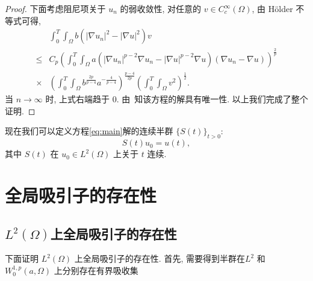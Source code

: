 \documentclass[oneside,longtitle]{LZUthesis}
\numberwithin{equation}{chapter}
\newcommand*\abs[1]{\lvert#1\rvert}
\newcommand*\Brace[1]{\lbrace#1\rbrace}
\begin{document}
\begin{proof}
	下面考虑阻尼项关于 $u_n$ 的弱收敛性,
	对任意的 $v \in C_c^\infty(\Omega)$, 由 H\"older 不等式可得,
	\begin{equation*}
		\begin{split}
			& \int_0^T\int_{\Omega}b\left(\abs{\nabla u_n}^2
			- \abs{\nabla u}^2\right)v\\
			\leq{} & C_p\left(\int_0^T\int_{\Omega}a
			\left(\abs{\nabla u_n}^{p-2}\nabla u_n
			- \abs{\nabla u}^{p-2}\nabla u\right)
			\left(\nabla u_n - \nabla u\right)\right)^{\frac{2}{p}}\\
			\times{} & \left(\int_0^T\int_{\Omega}b^{\frac{2p}{p-4}}a^{-\frac{4}{p-4}}\right)^{\frac{p-4}{2p}}
			\left(\int_0^T\int_{\Omega}v^2\right)^{\frac{1}{2}}.
		\end{split}
	\end{equation*}
	当 $n \to \infty$ 时, 上式右端趋于 $0$.
	由~\cite{Zhan2019Uniquenessa}知该方程的解具有唯一性.
	以上我们完成了整个证明.
\end{proof}

现在我们可以定义方程\eqref{eq:main}解的连续半群 $\Brace{S(t)}_{t>0}$:
\begin{equation*}
	S(t)u_0 = u(t),
\end{equation*}
其中 $S(t)$ 在 $u_{0} \in L^2(\Omega)$ 上关于 $t$ 连续.
\chapter{全局吸引子的存在性}\label{ch:existence_of_the_global_attractors}
\section{$L^2(\Omega)$上全局吸引子的存在性}
下面证明 $L^2(\Omega)$ 上全局吸引子的存在性.
首先, 需要得到半群在$L^2$ 和 $W_0^{1,p}(a,\Omega)$ 上分别存在有界吸收集
\end{document}
